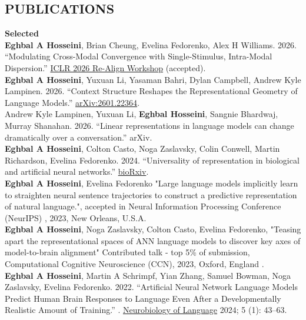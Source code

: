 \documentclass[margin, 10pt]{res}
\begin{document}
\begin{resume}
\section{PUBLICATIONS}
\textbf{Selected}\ 
\vspace{2mm} \\
\textbf{Eghbal A Hosseini}, Brian Cheung, Evelina Fedorenko, Alex H Williams. 2026. ``Modulating Cross-Modal Convergence with Single-Stimulus, Intra-Modal Dispersion.'' \href{https://openreview.net/forum?id=Ab3pRobOhv}{ICLR 2026 Re-Align Workshop} (accepted). \vspace{2.5mm} \\
\textbf{Eghbal A Hosseini}, Yuxuan Li, Yasaman Bahri, Dylan Campbell, Andrew Kyle Lampinen. 2026. ``Context Structure Reshapes the Representational Geometry of Language Models.'' \href{https://arxiv.org/abs/2601.22364}{arXiv:2601.22364}. \vspace{2.5mm} \\
Andrew Kyle Lampinen, Yuxuan Li, {\bf Eghbal Hosseini}, Sangnie Bhardwaj, Murray Shanahan. 2026. ``Linear representations in language models can change dramatically over a conversation.'' arXiv. \vspace{2.5mm} \\
\textbf{Eghbal A Hosseini}, Colton Casto, Noga Zaslavsky, Colin Conwell, Martin Richardson, Evelina Fedorenko. 2024. ``Universality of representation in biological and artificial neural networks.'' \href{https://www.biorxiv.org/content/10.1101/2024.12.26.629294v1.full}{bioRxiv}. \vspace{2.5mm} \\
\textbf{Eghbal A Hosseini}, Evelina Fedorenko "Large language models implicitly learn to straighten neural sentence trajectories to construct a predictive representation of natural language.", accepted in Neural Information Processing Conference (NeurIPS) , 2023, New Orleans, U.S.A. \vspace{2.5mm} \\
\textbf{Eghbal A Hosseini}, Noga Zaslavsky, Colton Casto, Evelina Fedorenko, "Teasing apart the representational spaces of ANN language models to discover key axes of model-to-brain alignment" {Contributed talk - top 5\% of submission, Computational Cognitive Neuroscience (CCN), 2023, Oxford, England }.  \vspace{2.5mm} \\
\textbf{Eghbal A Hosseini}, Martin A Schrimpf, Yian Zhang, Samuel Bowman, Noga Zaslavsky, Evelina Fedorenko. 2022. “Artificial Neural Network Language Models Predict Human Brain Responses to Language Even After a Developmentally Realistic Amount of Training.” . \href{https://doi.org/10.1162/nol\_a\_00137}{Neurobiology of Language} 2024; 5 (1): 43–63.  \vspace{2.5mm} \\

\end{resume}
\end{document}
